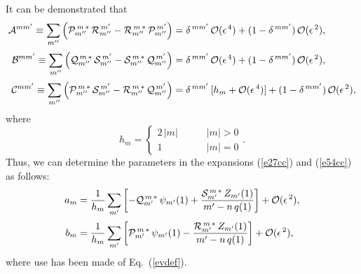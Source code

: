 \documentclass[12pt,prb,aps]{revtex4-1}
\begin{document}
It can be demonstrated that\,\cite{am1}
\begin{align}\label{e286}
{\cal A}^{mm'}\equiv\sum_{m''}\left({\cal P}_{m''}^{\,m\,\ast}\,{\cal R}_{m''}^{\,m'}- {\cal R}_{m''}^{\,m\,\ast}\,{\cal P}_{m''}^{\,m'}\right)&= \delta^{\,mm'}\,{\cal O}(\epsilon^{\,4})+ (1-\delta^{\,mm'})\,{\cal O}(\epsilon^{\,2}),\\[0.5ex]
{\cal B}^{mm'}\equiv\sum_{m''}\left({\cal Q}_{m''}^{\,m\,\ast}\,{\cal S}_{m''}^{\,m'}- {\cal S}_{m''}^{\,m\,\ast}\,{\cal Q}_{m''}^{\,m'}\right)&= \delta^{\,mm'}\,{\cal O}(\epsilon^{\,4})+ (1-\delta^{\,mm'})\,{\cal O}(\epsilon^{\,2}),\\[0.5ex]
{\cal C}^{mm'}\equiv\sum_{m''}\left({\cal P}_{m''}^{\,m\,\ast}\,{\cal S}_{m''}^{\,m'}- {\cal R}_{m''}^{\,m\,\ast}\,{\cal Q}_{m''}^{\,m'}\right)&= \delta^{\,mm'}\,[h_m+{\cal O}(\epsilon^{\,4})]+ (1-\delta^{\,mm'})\,{\cal O}(\epsilon^{\,2}),\label{e288}
\end{align}
where
\begin{equation}
h_m = \left\{\begin{array}{ccc}2\,|m|&~~~~~~&\mbox{$|m|>0$}\\[0.5ex]
1&&\mbox{$|m|=0$}\end{array}\right..
\end{equation}
Thus, we can determine the parameters in the expansions (\ref{e27cc}) and (\ref{e54cc}) as follows:
\begin{align}
a_m &= \frac{1}{h_m}\sum_{m'}\left[-{\cal Q}_{m'}^{\,m\,\ast}\,\psi_{m'}(1) + \frac{{\cal S}_{m'}^{\,m\,\ast}\,Z_{m'}(1)}{m'-n\,q(1)}\right]+{\cal O}(\epsilon^{\,2}),\\[0.5ex]
b_m &= \frac{1}{h_m}\sum_{m'}\left[{\cal P}_{m'}^{\,m\,\ast}\,\psi_{m'}(1) -\frac{{\cal R}_{m'}^{\,m\,\ast}\,Z_{m'}(1)}{m'-n\,q(1)}\right]+{\cal O}(\epsilon^{\,2}),\label{e291}
\end{align}
where use has been made of Eq.~(\ref{evdef}).
\end{document}

